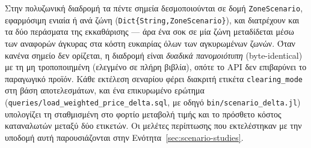 Στην πολυζωνική διαδρομή τα πέντε σημεία δεσμοποιούνται σε δομή \texttt{ZoneScenario}, εφαρμόσιμη ενιαία ή ανά ζώνη (\texttt{Dict\{String,ZoneScenario\}}), και διατρέχουν και τα δύο περάσματα της εκκαθάρισης --- άρα ένα σοκ σε μία ζώνη μεταδίδεται μέσω των αναφορών άγκυρας στα κόστη ευκαιρίας όλων των αγκυρωμένων ζωνών. Όταν κανένα σημείο δεν ορίζεται, η διαδρομή είναι \emph{δυαδικά πανομοιότυπη} (byte-identical) με τη μη τροποποιημένη (ελεγμένο σε πλήρη βιβλία), οπότε το API δεν επιβαρύνει το παραγωγικό προϊόν. Κάθε εκτέλεση σεναρίου φέρει διακριτή ετικέτα \texttt{clearing\_mode} στη βάση αποτελεσμάτων, και ένα επικυρωμένο ερώτημα (\texttt{queries/load\_weighted\_price\_delta.sql}, με οδηγό \texttt{bin/scenario\_delta.jl}) υπολογίζει τη σταθμισμένη στο φορτίο μεταβολή τιμής και το πρόσθετο κόστος καταναλωτών μεταξύ δύο ετικετών. Οι μελέτες περίπτωσης που εκτελέστηκαν με την υποδομή αυτή παρουσιάζονται στην Ενότητα~\ref{sec:scenario-studies}.
